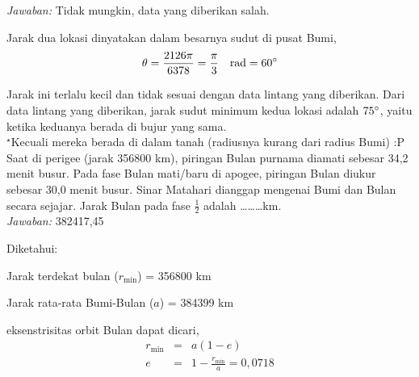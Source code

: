 \documentclass[11pt,fleqn]{exam}
\begin{document}
\begin{questions}
\textit{Jawaban: } Tidak mungkin, data yang diberikan salah.

Jarak dua lokasi dinyatakan dalam besarnya sudut di pusat Bumi,
\begin{equation*}
\theta = \frac{2126 \pi }{6378} = \frac{\pi}{3} \quad \text{rad} = 60\degree
\end{equation*}

Jarak ini terlalu kecil dan tidak sesuai dengan data lintang yang diberikan. Dari data lintang yang diberikan, jarak sudut minimum kedua lokasi adalah $75\degree$, yaitu ketika keduanya berada di bujur yang sama.\\


$^\star$Kecuali mereka berada di dalam tanah (radiusnya kurang dari radius Bumi) :P\\

\vspace{0.3cm}
\question Saat di perigee (jarak 356800 km), piringan Bulan purnama diamati sebesar 34,2 menit busur. Pada fase Bulan mati/baru di apogee, piringan Bulan diukur sebesar 30,0 menit busur. Sinar Matahari dianggap mengenai Bumi dan Bulan secara sejajar. Jarak Bulan pada fase $\frac{1}{2}$ adalah \ldots\ldots\ldots km.\\


\textit{Jawaban: } 382417,45

Diketahui:

Jarak terdekat bulan ($r_{\text{min}}$) = 356800 km

Jarak rata-rata Bumi-Bulan ($a$) = 384399 km

eksenstrisitas orbit Bulan dapat dicari,
\begin{eqnarray*}
r_{\text{min}} &=& a (1 - e)\\
e &=& 1 - \frac{r_{\text{min}}}{a} = 0,0718
\end{eqnarray*}


\end{questions}
\end{document}
